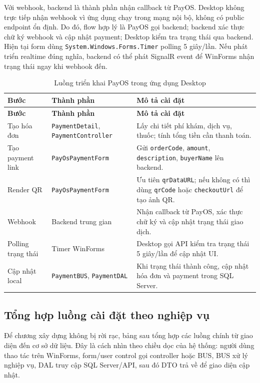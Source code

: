 \documentclass[12pt,a4paper]{article}
\numberwithin{figure}{subsection}
\numberwithin{table}{subsection}
\begin{document}
Với webhook, backend là thành phần nhận callback từ PayOS. Desktop không trực tiếp nhận webhook vì ứng dụng chạy trong mạng nội bộ, không có public endpoint ổn định. Do đó, flow hợp lý là PayOS gọi backend; backend xác thực chữ ký webhook và cập nhật payment; Desktop kiểm tra trạng thái qua backend. Hiện tại form dùng \texttt{System.Windows.Forms.Timer} polling 5 giây/lần. Nếu phát triển realtime đúng nghĩa, backend có thể phát SignalR event để WinForms nhận trạng thái ngay khi webhook đến.

\begin{longtable}{|p{3cm}|p{4.6cm}|p{6cm}|}
\caption{Luồng triển khai PayOS trong ứng dụng Desktop} \\
\hline
\textbf{Bước} & \textbf{Thành phần} & \textbf{Mô tả cài đặt} \\
\hline
\endfirsthead
\hline
\textbf{Bước} & \textbf{Thành phần} & \textbf{Mô tả cài đặt} \\
\hline
\endhead
Tạo hóa đơn & \texttt{PaymentDetail}, \texttt{PaymentController} & Lấy chi tiết phí khám, dịch vụ, thuốc; tính tổng tiền cần thanh toán. \\
\hline
Tạo payment link & \texttt{PayOsPaymentForm} & Gửi \texttt{orderCode}, \texttt{amount}, \texttt{description}, \texttt{buyerName} lên backend. \\
\hline
Render QR & \texttt{PayOsPaymentForm} & Ưu tiên \texttt{qrDataURL}; nếu không có thì dùng \texttt{qrCode} hoặc \texttt{checkoutUrl} để tạo ảnh QR. \\
\hline
Webhook & Backend trung gian & Nhận callback từ PayOS, xác thực chữ ký và cập nhật trạng thái giao dịch. \\
\hline
Polling trạng thái & Timer WinForms & Desktop gọi API kiểm tra trạng thái 5 giây/lần để cập nhật UI. \\
\hline
Cập nhật local & \texttt{PaymentBUS}, \texttt{PaymentDAL} & Khi trạng thái thành công, cập nhật hóa đơn và payment trong SQL Server. \\
\hline
\end{longtable}

\subsection{Tổng hợp luồng cài đặt theo nghiệp vụ}

Để chương xây dựng không bị rời rạc, bảng sau tổng hợp các luồng chính từ giao diện đến cơ sở dữ liệu. Đây là cách nhìn theo chiều dọc của hệ thống: người dùng thao tác trên WinForms, form/user control gọi controller hoặc BUS, BUS xử lý nghiệp vụ, DAL truy cập SQL Server/API, sau đó DTO trả về để giao diện cập nhật.
\end{document}
